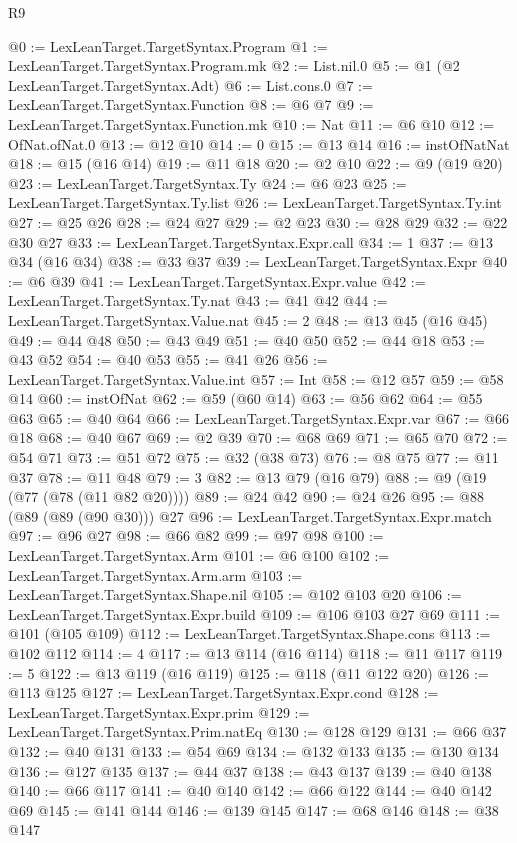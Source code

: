 \begin{lexlean}{R9}
\begin{coremodule}
@0 := LexLeanTarget.TargetSyntax.Program
@1 := LexLeanTarget.TargetSyntax.Program.mk
@2 := List.nil.{0}
@5 := @1 (@2 LexLeanTarget.TargetSyntax.Adt)
@6 := List.cons.{0}
@7 := LexLeanTarget.TargetSyntax.Function
@8 := @6 @7
@9 := LexLeanTarget.TargetSyntax.Function.mk
@10 := Nat
@11 := @6 @10
@12 := OfNat.ofNat.{0}
@13 := @12 @10
@14 := 0
@15 := @13 @14
@16 := instOfNatNat
@18 := @15 (@16 @14)
@19 := @11 @18
@20 := @2 @10
@22 := @9 (@19 @20)
@23 := LexLeanTarget.TargetSyntax.Ty
@24 := @6 @23
@25 := LexLeanTarget.TargetSyntax.Ty.list
@26 := LexLeanTarget.TargetSyntax.Ty.int
@27 := @25 @26
@28 := @24 @27
@29 := @2 @23
@30 := @28 @29
@32 := @22 @30 @27
@33 := LexLeanTarget.TargetSyntax.Expr.call
@34 := 1
@37 := @13 @34 (@16 @34)
@38 := @33 @37
@39 := LexLeanTarget.TargetSyntax.Expr
@40 := @6 @39
@41 := LexLeanTarget.TargetSyntax.Expr.value
@42 := LexLeanTarget.TargetSyntax.Ty.nat
@43 := @41 @42
@44 := LexLeanTarget.TargetSyntax.Value.nat
@45 := 2
@48 := @13 @45 (@16 @45)
@49 := @44 @48
@50 := @43 @49
@51 := @40 @50
@52 := @44 @18
@53 := @43 @52
@54 := @40 @53
@55 := @41 @26
@56 := LexLeanTarget.TargetSyntax.Value.int
@57 := Int
@58 := @12 @57
@59 := @58 @14
@60 := instOfNat
@62 := @59 (@60 @14)
@63 := @56 @62
@64 := @55 @63
@65 := @40 @64
@66 := LexLeanTarget.TargetSyntax.Expr.var
@67 := @66 @18
@68 := @40 @67
@69 := @2 @39
@70 := @68 @69
@71 := @65 @70
@72 := @54 @71
@73 := @51 @72
@75 := @32 (@38 @73)
@76 := @8 @75
@77 := @11 @37
@78 := @11 @48
@79 := 3
@82 := @13 @79 (@16 @79)
@88 := @9 (@19 (@77 (@78 (@11 @82 @20))))
@89 := @24 @42
@90 := @24 @26
@95 := @88 (@89 (@89 (@90 @30))) @27
@96 := LexLeanTarget.TargetSyntax.Expr.match
@97 := @96 @27
@98 := @66 @82
@99 := @97 @98
@100 := LexLeanTarget.TargetSyntax.Arm
@101 := @6 @100
@102 := LexLeanTarget.TargetSyntax.Arm.arm
@103 := LexLeanTarget.TargetSyntax.Shape.nil
@105 := @102 @103 @20
@106 := LexLeanTarget.TargetSyntax.Expr.build
@109 := @106 @103 @27 @69
@111 := @101 (@105 @109)
@112 := LexLeanTarget.TargetSyntax.Shape.cons
@113 := @102 @112
@114 := 4
@117 := @13 @114 (@16 @114)
@118 := @11 @117
@119 := 5
@122 := @13 @119 (@16 @119)
@125 := @118 (@11 @122 @20)
@126 := @113 @125
@127 := LexLeanTarget.TargetSyntax.Expr.cond
@128 := LexLeanTarget.TargetSyntax.Expr.prim
@129 := LexLeanTarget.TargetSyntax.Prim.natEq
@130 := @128 @129
@131 := @66 @37
@132 := @40 @131
@133 := @54 @69
@134 := @132 @133
@135 := @130 @134
@136 := @127 @135
@137 := @44 @37
@138 := @43 @137
@139 := @40 @138
@140 := @66 @117
@141 := @40 @140
@142 := @66 @122
@144 := @40 @142 @69
@145 := @141 @144
@146 := @139 @145
@147 := @68 @146
@148 := @38 @147

\end{coremodule}
\end{lexlean}
